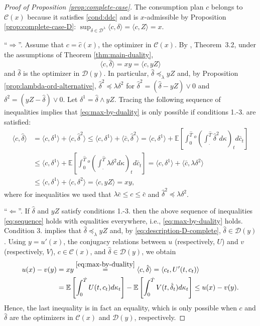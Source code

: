 \documentclass[11pt, oneside]{article}   	%
\theoremstyle{plain}
\theoremstyle{definition}
\theoremstyle{remark}
\begin{document}
\begin{proof}[Proof of Proposition \ref{prop:complete-case}]
The consumption plan $c$ belongs to $\mathcal{C}(x)$ because it satisfies \eqref{cond:ddc} and is $x$-admissible by Proposition \ref{prop:complete-case-D}: $\sup_{\delta\in\mathcal{D}^\lambda}\langle c,\delta \rangle=\langle c,Z \rangle=x$.

``$\Rightarrow$''. Assume that $c=\hat{c}(x)$, the optimizer in $\mathcal{C}(x)$. By \cite{mostovyi}, Theorem~3.2, under the assumptions of Theorem \ref{thm:main-duality},
\begin{equation}\label{eq:max-by-duality}
\langle c,\hat\delta \rangle=xy=\langle c,yZ \rangle
\end{equation}
and $\hat\delta$ is the optimizer in $\mathcal{D}(y)$. In particular, $\hat\delta\preceq_\lambda yZ$ and, by  Proposition \ref{prop:lambda-ord-alternative}, $\hat\delta^2\preceq\lambda\delta^2$ for $\hat\delta^2=(\hat\delta-yZ)\vee 0$ and $\delta^2=(yZ-\hat\delta)\vee 0$. Let $\delta^1=\hat\delta\wedge yZ$. Tracing the following sequence of inequalities implies that \eqref{eq:max-by-duality} is only possible if conditions 1.-3. are satisfied:
\begin{equation}\label{eq:sequence}
\begin{aligned}
\langle c,\hat\delta\rangle&=\langle c,\delta^1 \rangle+\langle c,\hat\delta^2 \rangle\leq\langle c,\delta^1 \rangle+\langle \bar{c},\hat\delta^2 \rangle=\langle c,\delta^1 \rangle+\mathbb{E}\left[\int_0^{\hat{T}} {}^o\left(\int_.^{\hat{T}} \hat\delta^2 d\kappa\right)_t d\bar{c}_t\right]\\
&\leq \langle c,\delta^1 \rangle+\mathbb{E}\left[\int_0^{\hat{T}} {}^o\left(\int_.^{\hat{T}} \lambda\delta^2 d\kappa\right)_t d\bar{c}_t\right]=\langle c,\delta^1 \rangle+\langle\bar{c},\lambda\delta^2 \rangle\\
&\leq\langle c,\delta^1 \rangle+\langle c,\delta^2 \rangle=\langle c,yZ \rangle=xy,
\end{aligned}
\end{equation}
where for inequalities we used that $\lambda\bar{c}\leq c\leq\bar{c}$ and $\hat\delta^2\preceq\lambda \delta^2$.

``$\Leftarrow$''. If $\hat\delta$ and $yZ$ satisfy conditions 1.-3. then the above sequence of inequalities \eqref{eq:sequence} holds with equalities everywhere, i.e., \eqref{eq:max-by-duality} holds. Condition 3. implies that $\hat\delta\preceq_\lambda yZ$ and, by \eqref{eq:description-D-complete}, $\hat\delta\in\mathcal{D}(y)$. Using $y=u'(x)$, the conjugacy relations between $u$ (respectively, $U$) and $v$ (respectively, $V$), $c\in\mathcal{C}(x)$, and $\hat\delta\in\mathcal{D}(y)$, we obtain
\begin{align*}
u(x)-v(y)&=xy\overset{\eqref{eq:max-by-duality}}{=}\langle c,\hat\delta \rangle=\langle c_t,U'(t,c_t) \rangle\\
&=\mathbb{E}\left[\int_0^{\hat{T}} U(t,c_t) d\kappa_t\right]-\mathbb{E}\left[\int_0^{\hat{T}} V(t,\hat\delta_t) d\kappa_t\right]\leq u(x)-v(y).
\end{align*}
Hence, the last inequality is in fact an equality, which is only possible when $c$ and $\hat\delta$ are the optimizers in $\mathcal{C}(x)$ and $\mathcal{D}(y)$, respectively.


\end{proof}
\end{document}
